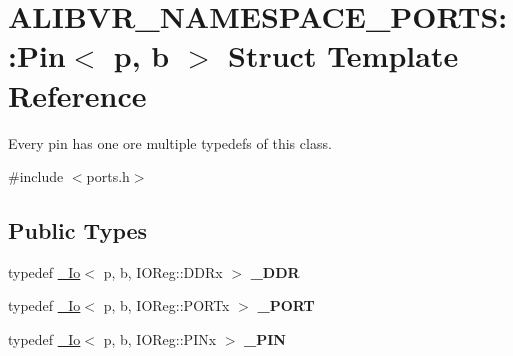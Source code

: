 \hypertarget{structALIBVR__NAMESPACE__PORTS_1_1Pin}{}\section{A\+L\+I\+B\+V\+R\+\_\+\+N\+A\+M\+E\+S\+P\+A\+C\+E\+\_\+\+P\+O\+R\+TS\+:\+:Pin$<$ p, b $>$ Struct Template Reference}
\label{structALIBVR__NAMESPACE__PORTS_1_1Pin}


Every pin has one ore multiple typedefs of this class.  




{\ttfamily \#include $<$ports.\+h$>$}

\subsection*{Public Types}
\begin{DoxyCompactItemize}
\item 
typedef \hyperlink{structALIBVR__NAMESPACE__PORTS_1_1__Io}{\+\_\+\+Io}$<$ p, b, I\+O\+Reg\+::\+D\+D\+Rx $>$ {\bfseries \+\_\+\+D\+DR}\hypertarget{structALIBVR__NAMESPACE__PORTS_1_1Pin_a5e6fcafd9ca01db67a49f91b136f39b5}{}\label{structALIBVR__NAMESPACE__PORTS_1_1Pin_a5e6fcafd9ca01db67a49f91b136f39b5}

\item 
typedef \hyperlink{structALIBVR__NAMESPACE__PORTS_1_1__Io}{\+\_\+\+Io}$<$ p, b, I\+O\+Reg\+::\+P\+O\+R\+Tx $>$ {\bfseries \+\_\+\+P\+O\+RT}\hypertarget{structALIBVR__NAMESPACE__PORTS_1_1Pin_ad8f3a316b465a96375f03931e4553a56}{}\label{structALIBVR__NAMESPACE__PORTS_1_1Pin_ad8f3a316b465a96375f03931e4553a56}

\item 
typedef \hyperlink{structALIBVR__NAMESPACE__PORTS_1_1__Io}{\+\_\+\+Io}$<$ p, b, I\+O\+Reg\+::\+P\+I\+Nx $>$ {\bfseries \+\_\+\+P\+IN}\hypertarget{structALIBVR__NAMESPACE__PORTS_1_1Pin_a11ae3125fff9d3ab32b40f52d3b8f835}{}\label{structALIBVR__NAMESPACE__PORTS_1_1Pin_a11ae3125fff9d3ab32b40f52d3b8f835}

\end{DoxyCompactItemize}
